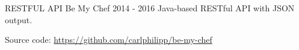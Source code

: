 \begin{cventries}
  \vspace{-2.0mm}
  \projectentry
  	{RESTFUL API} %
  	{Be My Chef} %
  	{2014 - 2016} %
    {Java-based RESTful API with JSON output.\linebreak
{}
    }
    {
    \begin{projectdetails}
        	\item Source code: \href{https://github.com/carlphilipp/be-my-chef}{https://github.com/carlphilipp/be-my-chef}
      \end{projectdetails}
    }

\end{cventries}
\vspace{-2.0mm}
